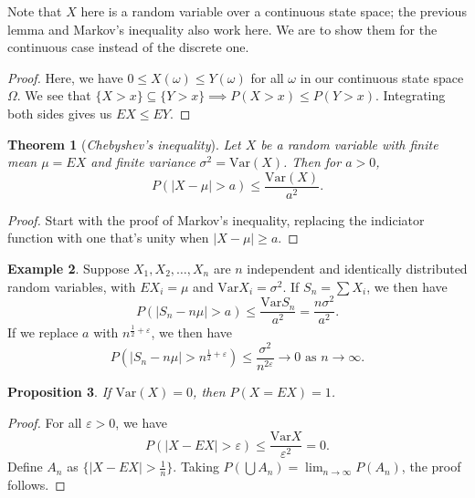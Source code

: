 \documentclass[15pt,a4paper]{book}
\newtheorem{theorem}{Theorem}[chapter]
\newtheorem{proposition}[theorem]{Proposition}
\theoremstyle{definition}
\newtheorem{example}[theorem]{Example}
\newcommand{\eax}[1]{\emph{#1}\index{#1}} %
\newcommand{\abs}[1]{\left| #1 \right|} %
\begin{document}
Note that $X$ here is a random variable over a continuous state space; the previous lemma and Markov's inequality also work here. We are to show them for the continuous case instead of the discrete one.

\begin{proof}
    Here, we have $0 \leq X(\omega) \leq Y(\omega)$ for all $\omega$ in our continuous state space $\Omega$. We see that $\{X > x\} \subseteq \{Y > x\} \implies P(X > x) \leq P(Y > x)$. Integrating both sides gives us $EX \leq EY$.
\end{proof}

\begin{theorem}[\eax{Chebyshev's inequality}]
    Let $X$ be a random variable with finite mean $\mu = EX$ and finite variance $\sigma^{2} = \text{Var}(X)$. Then for $a > 0$, 
    \begin{equation}
        P(\abs{X-\mu}>a) \leq \frac{\text{Var}(X)}{a^{2}}.
    \end{equation}
\end{theorem}
\begin{proof}
    Start with the proof of Markov's inequality, replacing the indiciator function with one that's unity when $\abs{X-\mu} \geq a$.
\end{proof}
\begin{example}
    Suppose $X_{1}, X_{2}, \ldots, X_{n}$ are $n$ independent and identically distributed random variables, with $EX_{i} = \mu$ and $\text{Var}X_{i} = \sigma^{2}$. If $S_{n} = \sum X_{i}$, we then have
    \begin{equation}
        P(\abs{S_{n}-n\mu} > a) \leq \frac{\text{Var}S_{n}}{a^{2}} = \frac{n\sigma^{2}}{a^{2}}.
    \end{equation}
    If we replace $a$ with $n^{\frac{1}{2}+\varepsilon}$, we then have
    \begin{equation}
        P(\abs{S_{n}-n\mu} > n^{\frac{1}{2}+\varepsilon}) \leq \frac{\sigma^{2}}{n^{2 \varepsilon}} \to 0 \text{ as } n \to \infty.
    \end{equation}
\end{example}
\begin{proposition}
    If $\text{Var}(X) = 0$, then $P(X=EX) = 1$.
\end{proposition}
\begin{proof}
    For all $\varepsilon > 0$, we have
    \begin{equation}
        P(\abs{X-EX} > \varepsilon) \leq \frac{\text{Var}X}{\varepsilon^{2}} = 0.
    \end{equation}
    Define $A_{n}$ as $\{\abs{X-EX} > \frac{1}{n}\}$. Taking $P(\bigcup A_{n}) = \lim_{n \to \infty} P(A_{n})$, the proof follows.
\end{proof}
\end{document}
